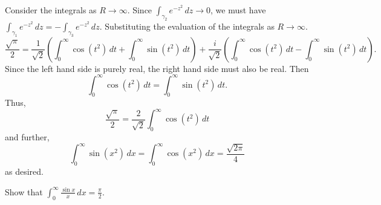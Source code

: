 \documentclass[12 pt, letterpaper]{hmcpset}
\begin{document}
\begin{solution}
	Consider the integrals as $R \to \infty$. Since $\int_{\gamma_{2}} e^{-z^{2}} \, dz \to 0$, we must have $\int_{\gamma_{1}} e^{-z^{2}} \, dz  = - \int_{\gamma_{3}} e^{-z^{2}} \, dz $. Substituting the evaluation of the integrals as $R \to \infty$.
	\[
		\frac{\sqrt{\pi}}{2} = \frac{1}{\sqrt{2}} \left ( \int_{0}^{\infty} \cos{(t^{2})} \, dt + \int_{0}^{\infty} \sin{(t^{2})} \, dt  \right ) + \frac{i}{\sqrt{2}} \left ( \int_{0}^{\infty} \cos{(t^{2})} \, dt - \int_{0}^{\infty} \sin{(t^{2})} \, dt   \right ).
	\]
	Since the left hand side is purely real, the right hand side must also be real. Then
	\[
		\int_{0}^{\infty} \cos{(t^{2})} \, dt = \int_{0}^{\infty} \sin{(t^{2})} \, dt.
	\]
	Thus,
	\[
		\frac{\sqrt{\pi}}{2} = \frac{2}{\sqrt{2}} \int_{0}^{\infty} \cos{(t^{2})} \, dt 
	\]
	and further,
	\[
		\int_{0}^{\infty} \sin{(x^{2})} \, dx = \int_{0}^{\infty} \cos{(x^{2})} \, dx = \frac{\sqrt{2 \pi}}{4}
	\]
	as desired.
\end{solution}

\pagebreak

\begin{problem}[2]
	Show that $\displaystyle \int_{0}^{\infty} \frac{\sin{x}}{x} \, dx = \frac{\pi}{2}$.
\end{problem}
\end{document}
